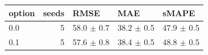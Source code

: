\begin{tabular}{lrlll}
\toprule
option & seeds & RMSE & MAE & sMAPE \\
\midrule
0.0 & 5 & 58.0 $\pm$ 0.7 & 38.2 $\pm$ 0.5 & 47.9 $\pm$ 0.5 \\
0.1 & 5 & 57.6 $\pm$ 0.8 & 38.4 $\pm$ 0.5 & 48.8 $\pm$ 0.5 \\
\bottomrule
\end{tabular}

